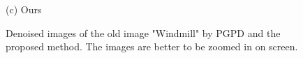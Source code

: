 \documentclass[runningheads]{llncs}
\begin{document}
\begin{figure}
{\begin{minipage}[t]{0.33\textwidth}
{\footnotesize (c) Ours }
\end{minipage}
}
\caption{Denoised images of the old image "Windmill" by PGPD and the proposed method. The images are better to be zoomed in on screen.}
\label{fig39}
\end{figure}
\end{document}

